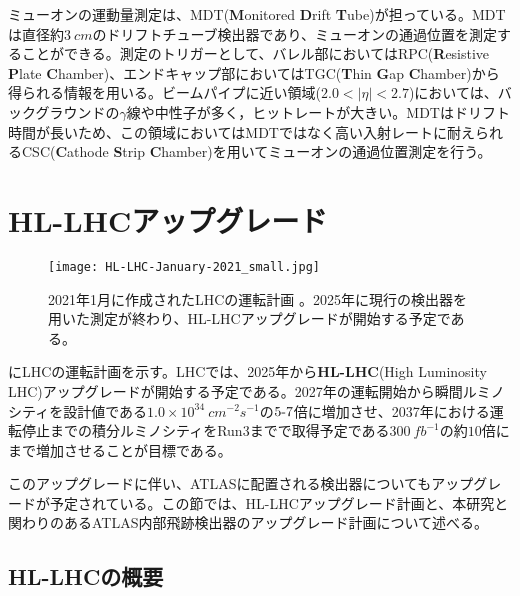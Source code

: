 ミューオンの運動量測定は、MDT(\textbf{M}onitored \textbf{D}rift \textbf{T}ube)が担っている。MDTは直径約$3\ \si{cm}$のドリフトチューブ検出器であり、ミューオンの通過位置を測定することができる。測定のトリガーとして、バレル部においてはRPC(\textbf{R}esistive \textbf{P}late \textbf{C}hamber)、エンドキャップ部においてはTGC(\textbf{T}hin \textbf{G}ap \textbf{C}hamber)から得られる情報を用いる。ビームパイプに近い領域($2.0<|\eta|<2.7$)においては、バックグラウンドの$\gamma$線や中性子が多く，ヒットレートが大きい。MDTはドリフト時間が長いため、この領域においてはMDTではなく高い入射レートに耐えられるCSC(\textbf{C}athode \textbf{S}trip \textbf{C}hamber)を用いてミューオンの通過位置測定を行う。



\section{HL-LHCアップグレード}
\label{sec:HL-LHC}
\begin{figure}[tbp]
  \centering
  \texttt{[image: HL-LHC-January-2021\_small.jpg]}
  \caption[LHCの運転計画]{2021年1月に作成されたLHCの運転計画 \cite{hl-lhc}。2025年に現行の検出器を用いた測定が終わり、HL-LHCアップグレードが開始する予定である。}
  \label{fig:hl-lhc}
\end{figure}

にLHCの運転計画を示す。LHCでは、2025年から\textbf{HL-LHC}(High Luminosity LHC)アップグレードが開始する予定である。2027年の運転開始から瞬間ルミノシティを設計値である$1.0\times 10^{34}\ \si{cm^{-2}s^{-1}}$の$5 \mathchar`- 7$倍に増加させ、2037年における運転停止までの積分ルミノシティをRun3までで取得予定である$300\ \si{fb^{-1}}$の約$10$倍にまで増加させることが目標である。

このアップグレードに伴い、ATLASに配置される検出器についてもアップグレードが予定されている。この節では、HL-LHCアップグレード計画と、本研究と関わりのあるATLAS内部飛跡検出器のアップグレード計画について述べる。

\subsection{HL-LHCの概要}
\label{sec:HL-LHC-gaiyou}

